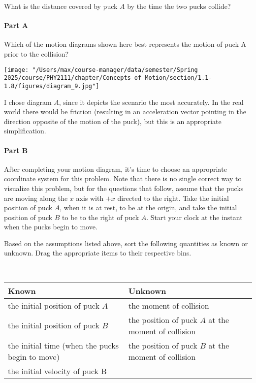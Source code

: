 What is the distance covered by puck $A$ by the time the two pucks collide?

\paragraph{Part A}

Which of the motion diagrams shown here best represents the motion of puck A prior to the collision?

\begin{center}
	\texttt{[image: "/Users/max/course-manager/data/semester/Spring 2025/course/PHY2111/chapter/Concepts of Motion/section/1.1-1.8/figures/diagram\_9.jpg"]}
\end{center}

\begin{solution}
	I chose diagram $A$, since it depicts the scenario the most accurately. In the real world there would be friction (resulting in an acceleration vector pointing in the direction opposite of the motion of the puck), but this is an appropriate simplification.
\end{solution}

\paragraph{Part B}

After completing your motion diagram, it's time to choose an appropriate coordinate system for this problem. Note that there is no single correct way to visualize this problem, but for the questions that follow, assume that the pucks are moving along the $x$ axis with $+x$ directed to the right. Take the initial position of puck $A$, when it is at rest, to be at the origin, and take the initial position of puck $B$ to be to the right of puck $A$. Start your clock at the instant when the pucks begin to move.

Based on the assumptions listed above, sort the following quantities as known or unknown.
Drag the appropriate items to their respective bins.

\vspace{1em}

\begin{solution}~

	\begin{center}
		\begin{tabular}{p{13em}|p{13em}}
			Known                                           & Unknown                                             \\
			\hline
			the initial position of puck $A$                & the moment of collision                             \\
			the initial position of puck $B$                & the position of puck $A$ at the moment of collision \\
			the initial time (when the pucks begin to move) & the position of puck $B$ at the moment of collision \\
			the initial velocity of puck B                  &
		\end{tabular}
	\end{center}

\end{solution}

